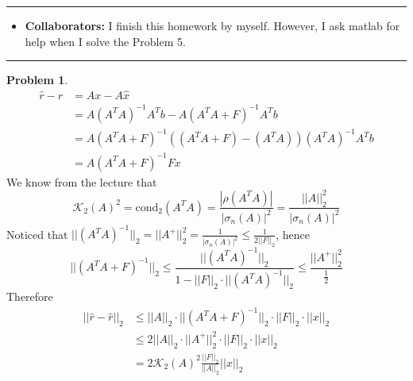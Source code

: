 \documentclass[a4paper]{article}
\theoremstyle{definition}
\newtheorem{problem}{Problem}
\theoremstyle{plain}
\newcommand{\cond}[1]{\mathrm{cond}_{#1}}
\newcommand{\dps}{\displaystyle}
\numberwithin{equation}{problem}
\begin{document}
\courseheader
{}
\rule{\textwidth}{1pt}
\begin{itemize}
\item {\bf Collaborators: \/}
  I finish this homework by myself. However, I ask matlab for help when I solve the Problem 5.
\end{itemize}
\rule{\textwidth}{1pt}

\vspace{2em}
 
\sloppy
{}

\begin{problem}
    \begin{align*}
        \hat{r}-r&=Ax-A\hat{x}\\
        &=A(A^TA)^{-1}A^Tb-A(A^TA+F)^{-1}A^Tb\\
        &=A(A^TA+F)^{-1}\left((A^TA+F)-(A^TA)\right)(A^TA)^{-1}A^Tb\\
        &=A(A^TA+F)^{-1}Fx
    \end{align*}
    We know from the lecture that
    \[\mathcal{K}_2(A)^2=\cond{2}(A^TA)=\dps\frac{|\rho(A^TA)|}{|\sigma_n(A)|^2}=\frac{||A||_2^2}{|\sigma_n(A)|^2}\]
    Noticed that  $ \dps||(A^TA)^{-1}||_2=||A^+||_2^2=\frac{1}{|\sigma_n(A)|^2} \leq \frac{1}{2||F||_2} $, hence 
    \[||(A^TA+F)^{-1}||_2  \leq \frac{||(A^TA)^{-1}||_2}{1-||F||_2\cdot||(A^TA)^{-1}||_2} \leq \frac{||A^+||_2^2}{\frac{1}{2}}\]
    Therefore
    \begin{align*}
        ||\hat{r}-\hat{r}||_2& \leq ||A||_2\cdot||(A^TA+F)^{-1}||_2\cdot||F||_2\cdot||x||_2\\
        & \leq 2||A||_2\cdot||A^+||_2^2\cdot||F||_2\cdot||x||_2\\
        &=2\mathcal{K}_2(A)^2\frac{||F||_2}{||A||_2}||x||_2
    \end{align*}
\end{problem}
\end{document}
